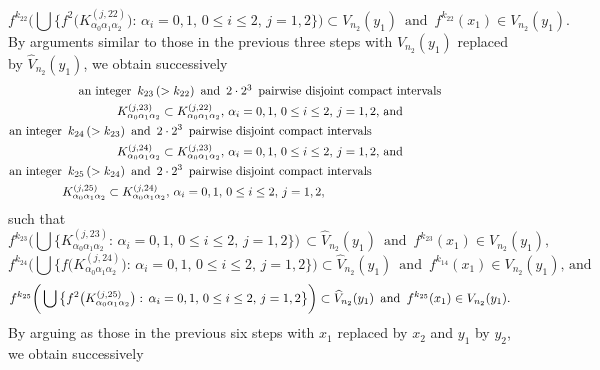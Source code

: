 \documentclass[12pt]{article}
\newcommand{\al}{\alpha}
\begin{document}
$$
f^{k_{22}}\bigg(\bigcup \big\{ f^2\big(K_{\al_0\al_1\al_2}^{(j,22)}\big): \, \al_i = 0, 1, \, 0 \le i \le 2, \, j = 1, 2 \big\}\bigg) \subset V_{n_2}(y_1) \,\,\, \text{and} \,\,\, f^{k_{22}}(x_1) \in V_{n_2}(y_1).%
$$
\indent By arguments similar to those in the previous three steps with $V_{n_2}(y_1)$ replaced by $\widehat V_{n_2}(y_1)$, we obtain successively 
\begin{multline*}
$$
\text{an integer} \,\,\, k_{23} \, (> k_{22}) \,\,\, \text{and} \,\,\, 2 \cdot 2^3 \,\,\, \text{pairwise disjoint compact intervals} \\      K_{\al_0\al_1\al_2}^{(j,23)} \subset K_{\al_0\al_1\al_2}^{(j,22)}, \, \al_i = 0, 1, \, 0 \le i \le 2, \, j = 1, 2, \, \text{and} \\
\text{an integer} \,\,\, k_{24} \, (> k_{23}) \,\,\, \text{and} \,\,\, 2 \cdot 2^3 \,\,\, \text{pairwise disjoint compact intervals}\qquad\qquad\qquad\qquad\qquad\quad\,\,\, \\ 
K_{\al_0\al_1\al_2}^{(j,24)} \subset K_{\al_0\al_1\al_2}^{(j,23)}, \, \al_i = 0, 1, \, 0 \le i \le 2, \, j = 1, 2, \, \text{and}  \\
\text{an integer} \,\,\, k_{25} \, (> k_{24}) \,\,\, \text{and} \,\,\, 2 \cdot 2^3 \,\,\, \text{pairwise disjoint compact intervals}\qquad\qquad\qquad\qquad\qquad\quad\,\,\, \\ 
K_{\al_0\al_1\al_2}^{(j,25)} \subset K_{\al_0\al_1\al_2}^{(j,24)}, \, \al_i = 0, 1, \, 0 \le i \le 2, \, j = 1, 2, \qquad\qquad\qquad\qquad\qquad\quad
$$
\end{multline*}
such that
$$
f^{k_{23}}\bigg(\bigcup \big\{ K_{\al_0\al_1\al_2}^{(j,23)}: \, \al_i = 0, 1, \, 0 \le i \le 2, \, j = 1, 2 \big\}\bigg) \, \subset \widehat V_{n_2}(y_1) \,\,\, \text{and} \,\,\, f^{k_{23}}(x_1) \in V_{n_2}(y_1),
$$
$$
f^{k_{24}}\bigg(\bigcup \big\{ f\big(K_{\al_0\al_1\al_2}^{(j,24)}\big): \, \al_i = 0, 1, \, 0 \le i \le 2, \, j = 1, 2 \big\}\bigg) \subset \widehat V_{n_2}(y_1) \,\,\, \text{and} \,\,\, f^{k_{14}}(x_1) \in V_{n_2}(y_1),\, \text{and}
$$
$$
f^{k_{25}}\bigg(\bigcup \big\{ f^2\big(K_{\al_0\al_1\al_2}^{(j,25)}\big): \, \al_i = 0, 1, \, 0 \le i \le 2, \, j = 1, 2 \big\}\bigg) \subset \widehat V_{n_2}(y_1) \,\,\, \text{and} \,\,\, f^{k_{25}}(x_1) \in V_{n_2}(y_1).\vspace{.1in}
$$
\indent By arguing as those in the previous six steps with $x_1$ replaced by $x_2$ and $y_1$ by $y_2$, we obtain successively
\end{document}
